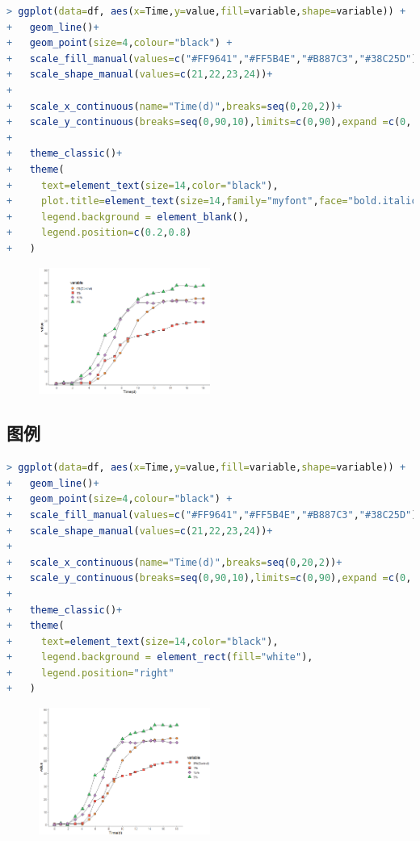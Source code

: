 \documentclass[11pt,a4paper,oneside]{book}
\begin{document}
\begin{lstlisting}[language=r]
> ggplot(data=df, aes(x=Time,y=value,fill=variable,shape=variable)) + 
+   geom_line()+
+   geom_point(size=4,colour="black") +
+   scale_fill_manual(values=c("#FF9641","#FF5B4E","#B887C3","#38C25D"))+
+   scale_shape_manual(values=c(21,22,23,24))+
+   
+   scale_x_continuous(name="Time(d)",breaks=seq(0,20,2))+
+   scale_y_continuous(breaks=seq(0,90,10),limits=c(0,90),expand =c(0, 1))+
+   
+   theme_classic()+
+   theme(
+     text=element_text(size=14,color="black"),
+     plot.title=element_text(size=14,family="myfont",face="bold.italic",hjust=.5,color="black"),
+     legend.background = element_blank(),
+     legend.position=c(0.2,0.8)
+   )
\end{lstlisting}
\begin{figure}[H]
	\centering
	\includegraphics[width=0.5\textwidth]{screenshot007}
\end{figure}

\subsection{图例}
\begin{lstlisting}[language=r]
> ggplot(data=df, aes(x=Time,y=value,fill=variable,shape=variable)) + 
+   geom_line()+
+   geom_point(size=4,colour="black") +
+   scale_fill_manual(values=c("#FF9641","#FF5B4E","#B887C3","#38C25D"))+
+   scale_shape_manual(values=c(21,22,23,24))+
+   
+   scale_x_continuous(name="Time(d)",breaks=seq(0,20,2))+
+   scale_y_continuous(breaks=seq(0,90,10),limits=c(0,90),expand =c(0, 1))+
+   
+   theme_classic()+
+   theme(
+     text=element_text(size=14,color="black"),
+     legend.background = element_rect(fill="white"),
+     legend.position="right"
+   )
\end{lstlisting}
\begin{figure}[H]
	\centering
	\includegraphics[width=0.5\textwidth]{screenshot008}
\end{figure}
\end{document}
